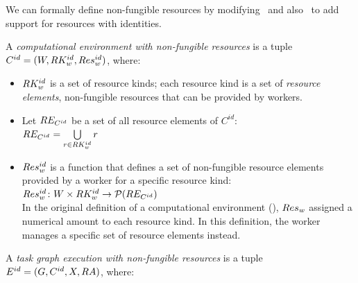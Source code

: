 We can formally define non-fungible resources by modifying~ and
also~ to add support for resources with identities.

\vspace{2mm}
 A
\emph{computational environment with non-fungible resources} is a tuple
$C^{id} = (W, RK_w^{id}, Res_w^{id})$, where:
\begin{itemize}[itemsep=0pt]
	\item $RK_w^{id}$ is a set of resource kinds; each resource kind is a set of
	      \emph{resource elements}, non-fungible resources that can be provided by workers.
	\item Let $RE_{C^{id}}$ be a set of all resource elements of $C^{id}$: \\
	      $RE_{C^{id}} = \bigcup\limits_{r\in RK_w^{id}} r$
	\item $Res_w^{id}$ is a function that defines a set of non-fungible resource elements
		  provided by a worker for a specific resource kind: \\ $Res_w^{id}\colon W \times RK_w^{id} \rightarrow \mathcal{P}(RE_{C^{id}})$\vspace{2mm}\\
		  In the original definition of a computational environment (), $Res_w$ assigned a numerical
		  amount to each resource kind. In this  definition, the worker manages a specific set
		  of resource elements instead.
\end{itemize}

\vspace{2mm}
 A
\emph{task graph execution with non-fungible resources} is a tuple $E^{id} = (G, C^{id}, X,
	RA)$, where:

